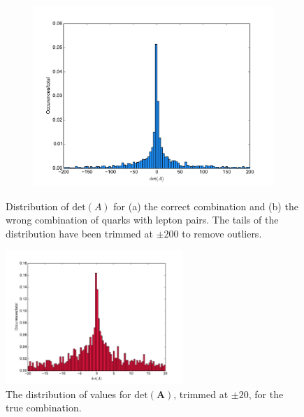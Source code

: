 \documentclass[twoside,english]{uiofysmaster}
\begin{document}
\begin{figure}[hbt]
	\begin{subfigure}[b]{0.6\textwidth}
		\includegraphics[width=\textwidth]{figures/improving_combinatorics/histogram_detA_wrongcombo_herwigpp-nosmear.pdf}
		\caption{ } 
		\label{fig:detA_distribution_b}
	\end{subfigure}
	\caption{Distribution of $\mathrm{det}(A)$ for (a) the correct combination and (b) the wrong combination of quarks with lepton pairs. The tails of the distribution have been trimmed at $\pm 200$ to remove outliers.}
	\label{fig:detA_distribution}
\end{figure}


\begin{figure}[hbt]
	\centering
	\includegraphics[width=0.6\textwidth]{figures/improving_combinatorics/histogram_detA_truecomb_trim20.pdf} 
	\caption{The distribution of values for $\mathrm{det}(\mathbf A)$, trimmed at $\pm 20$, for the true combination.}
	\label{fig:detA_distribution_zoom}
\end{figure}
\end{document}

